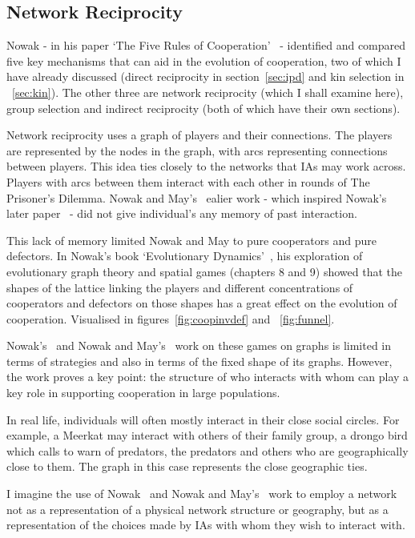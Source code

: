 \documentclass[]{final_report}
\begin{document}
\subsection{Network Reciprocity}
\label{appendix:netreciprocity}
Nowak - in his paper `The Five Rules of Cooperation'~\cite{five_rules_coop} - identified and compared five key mechanisms that can aid in the evolution of cooperation, two of which I have already discussed (direct reciprocity in section~\ref{sec:ipd} and kin selection in ~\ref{sec:kin}). The other three are network reciprocity (which I shall examine here), group selection and indirect reciprocity (both of which have their own sections).\par
Network reciprocity uses a graph of players and their connections. The players are represented by the nodes in the graph, with arcs representing connections between players. This idea ties closely to the networks that IAs may work across. Players with arcs between them interact with each other in rounds of The Prisoner's Dilemma. Nowak and May's~\cite{spatial} ealier work - which inspired Nowak's later paper~\cite{five_rules_coop} - did not give individual's any memory of past interaction.\par
This lack of memory limited Nowak and May to pure cooperators and pure defectors. In Nowak's book `Evolutionary Dynamics'~\cite{nowak2006evolutionary}, his exploration of evolutionary graph theory and spatial games (chapters 8 and 9) showed that the shapes of the lattice linking the players and different concentrations of cooperators and defectors on those shapes has a great effect on the evolution of cooperation. Visualised in figures~\ref{fig:coopinvdef} and ~\ref{fig:funnel}.\par
Nowak's~\cite{five_rules_coop, nowak2006evolutionary} and Nowak and May's~\cite{spatial} work on these games on graphs is limited in terms of strategies and also in terms of the fixed shape of its graphs. However, the work proves a key point: the structure of who interacts with whom can play a key role in supporting cooperation in large populations.\par
In real life, individuals will often mostly interact in their close social circles. For example, a Meerkat may interact with others of their family group, a drongo bird which calls to warn of predators, the predators and others who are geographically close to them. The graph in this case represents the close geographic ties.\par
I imagine the use of Nowak~\cite{five_rules_coop, nowak2006evolutionary} and Nowak and May's~\cite{spatial} work to employ a network not as a representation of a physical network structure or geography, but as a representation of the choices made by IAs with whom they wish to interact with.\par
\end{document}
